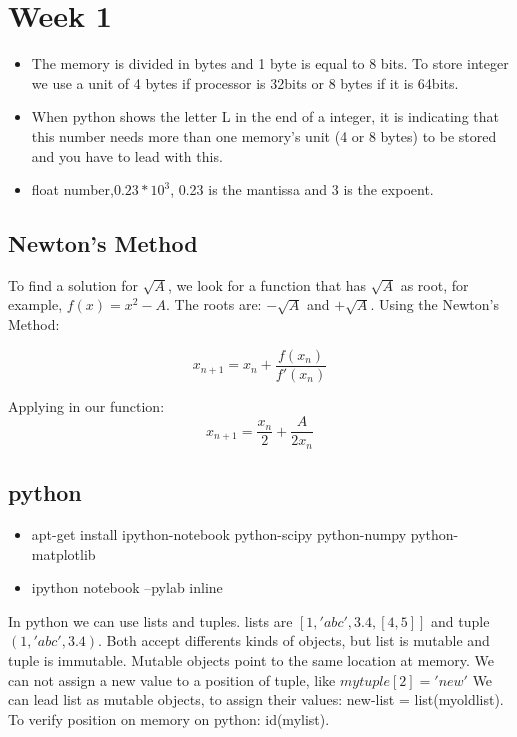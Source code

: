 \section{Week 1}
\begin{itemize}
\item The memory is divided in bytes and 1 byte is equal to 8 bits. To store integer we use a unit of 4 bytes if processor is 32bits or 8 bytes if it is 64bits. 
\item When python shows the letter L in the end of a integer, it is indicating that this number needs more than one memory's unit (4 or 8 bytes) to be stored and you have to lead with this.
\item float number,$0.23 * 10^3$, 0.23 is the mantissa and 3 is the expoent. 
\end{itemize}

\subsection{Newton's Method}
To find a solution for $\sqrt{A}$, we look for a function that has $\sqrt{A}$ as root, for example, $f(x)=x^2-A$. The roots are: $-\sqrt{A}$ and $+\sqrt{A}$. Using the Newton's Method:

\begin{equation}
  x_{n+1} = x_n + \frac{f(x_n)}{f\prime(x_n)} 
\end{equation}

Applying in our function: 
\begin{equation}
  x_{n+1} = \frac{x_n}{2} + \frac{A}{2x_n}
\end{equation}

\subsection{python}
\begin{itemize}
  \item apt-get install ipython-notebook python-scipy python-numpy python-matplotlib
  \item ipython notebook --pylab inline
\end{itemize}

In python we can use lists and tuples. lists are $[1,'abc',3.4,[4,5]]$ and tuple $(1,'abc',3.4)$. 
Both accept differents kinds of objects, but list is mutable and tuple is immutable. Mutable objects point to the same location at memory. We can not assign a new value to a position of tuple, like $mytuple[2] = 'new'$
We can lead list as mutable objects, to assign their values: 
new-list = list(myoldlist). To verify position on memory on python: id(mylist).

